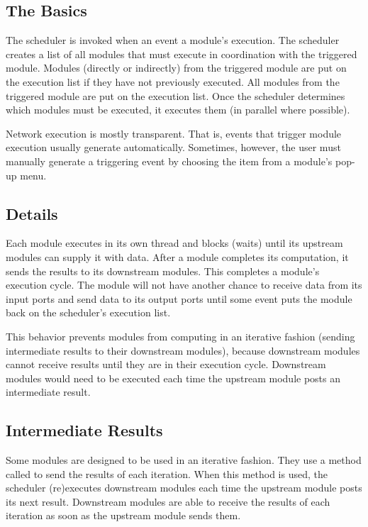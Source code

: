 \subsection{The Basics}

The scheduler is invoked when an event  a
module's execution.  The scheduler creates a list of all modules that
must execute in coordination with the triggered module. Modules
 (directly or indirectly) from the triggered module are 
put on the execution list if they have not previously executed.
All modules  from the triggered module are put
on the execution list.  Once the scheduler determines which modules must be
executed, it executes them (in parallel where possible).

Network execution is mostly transparent.  That is, events that trigger
module execution usually generate automatically. Sometimes,
however, the user must manually
generate a triggering event by choosing the  item from a
module's pop-up menu.

\subsection{Details}

Each module executes in its own thread and blocks (waits) until its upstream
modules can supply it with data.  After a module completes its computation,
it sends the results to its downstream modules.  This completes a module's
execution cycle.  The module will not have another chance to receive data from its input ports
and send data to its output ports until some event
puts the  module back on the scheduler's execution list.  

This behavior prevents modules from computing in an iterative fashion 
(sending intermediate results to their downstream modules), because
downstream modules cannot receive results until they are in their
execution cycle. Downstream modules would need to be executed each time the
upstream module posts an intermediate result.


\subsection{Intermediate Results}

Some modules are designed to be used in an iterative fashion. They use
a method called  to send the results of each
iteration.  When this method is used, the scheduler (re)executes
downstream modules each time the upstream module posts its next
result.  Downstream modules are able to receive the results of each
iteration as soon as the upstream module sends them.

